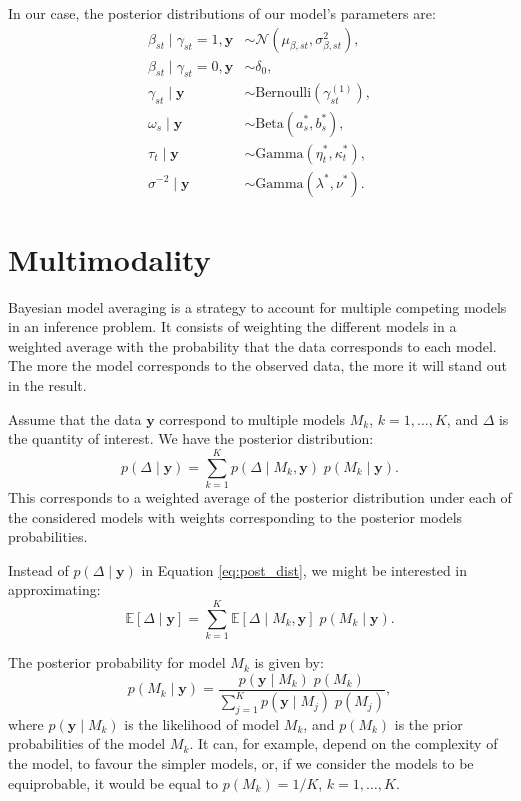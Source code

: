 \documentclass[a4paper, 11pt]{report}
\numberwithin{equation}{chapter}
\begin{document}
In our case, the posterior distributions of our model's parameters are:
\begin{align*}
\beta_{st} \mid \gamma_{st} = 1, \boldsymbol{y} &\sim \mathcal{N}\left(\mu_{\beta, st},\sigma^2_{\beta, st}\right),\\
\beta_{st} \mid \gamma_{st} = 0, \boldsymbol{y} &\sim \delta_0,\\
\gamma_{st} \mid \boldsymbol{y} &\sim \text{Bernoulli}(\gamma_{st}^{(1)}),\\
\omega_s\mid\boldsymbol{y} &\sim \text{Beta}(a_s^*,b_s^*),\\
\tau_t\mid \boldsymbol{y} &\sim \text{Gamma}(\eta^*_t, \kappa^*_t),\\
\sigma^{-2} \mid \boldsymbol{y} &\sim \text{Gamma}(\lambda^*, \nu^*).
\end{align*}

\newpage
\chapter{Multimodality}

Bayesian model averaging is a strategy to account for multiple competing models in an inference problem. It consists of weighting the different models in a weighted average with the probability that the data corresponds to each model. The more the model corresponds to the observed data, the more it will stand out in the result.

Assume that the data $\boldsymbol{y}$ correspond to multiple models $M_k$, $k= 1,\ldots,K$, and $\Delta$ is the quantity of interest. We have the posterior distribution:
\begin{equation}
p(\Delta \mid \boldsymbol{y}) = \sum_{k=1}^K p(\Delta \mid M_k,\boldsymbol{y}) \; p(M_k \mid \boldsymbol{y}).
\label{eq:post_dist}
\end{equation}
This corresponds to a weighted average of the posterior distribution under each of the considered models with weights corresponding to the posterior models probabilities.

Instead of $p(\Delta \mid \boldsymbol{y})$ in Equation \ref{eq:post_dist}, we might be interested in approximating:
\begin{equation*}
\mathbb{E}\left[\Delta \mid \boldsymbol{y}\right] = \sum_{k=1}^K\mathbb{E}\left[\Delta \mid M_k, \boldsymbol{y}\right]\;p(M_k \mid \boldsymbol{y}).
\end{equation*}

The posterior probability for model $M_k$ is given by:
\begin{equation}
p(M_k \mid \boldsymbol{y}) = \frac{p(\boldsymbol{y} \mid M_k)\; p(M_k)}{\sum_{j=1}^K p(\boldsymbol{y} \mid M_j)\; p(M_j)},
\label{eq:post_prob}
\end{equation}
where $p(\boldsymbol{y} \mid M_k)$ is the likelihood of model $M_k$, and $p(M_k)$ is the prior probabilities of the model $M_k$. It can, for example, depend on the complexity of the model, to favour the simpler models, or, if we consider the models to be equiprobable, it would be equal to $p(M_k) = 1/K$, $k = 1,\ldots,K$.  
\end{document}
